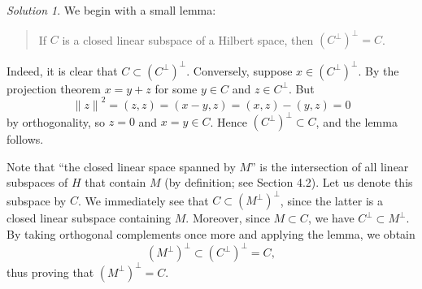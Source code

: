 \documentclass{report}
\newcommand{\norm}[1]{{\lVert #1 \rVert}}
\theoremstyle{remark}
\newtheorem*{solution}{Solution}
\begin{document}
\begin{solution}
  We begin with a small lemma:
  \begin{quote}
    If $C$ is a closed linear subspace of a Hilbert space, then $(C^\perp)^\perp = C$.
  \end{quote}
  Indeed, it is clear that $C \subset (C^\perp)^\perp$. Conversely, suppose $x \in (C^\perp)^\perp$. By the projection theorem $x = y + z$ for some $y \in C$ and $z \in C^\perp$. But
  \begin{equation*}
    \norm{z}^2 = (z,z) = (x-y,z) = (x,z) - (y,z) = 0
  \end{equation*}
  by orthogonality, so $z = 0$ and $x = y \in C$. Hence $(C^\perp)^\perp \subset C$, and the lemma follows.

  Note that ``the closed linear space spanned by $M$'' is the intersection of all linear subspaces of $H$ that contain $M$ (by definition; see Section 4.2). Let us denote this subspace by $C$. We immediately see that $C \subset (M^\perp)^\perp$, since the latter is a closed linear subspace containing $M$. Moreover, since $M \subset C$, we have $C^\perp \subset M^\perp$. By taking orthogonal complements once more and applying the lemma, we obtain
  \begin{equation*}
    (M^\perp)^\perp \subset (C^\perp)^\perp = C,
  \end{equation*}
  thus proving that $(M^\perp)^\perp = C$.
\end{solution}
\end{document}
